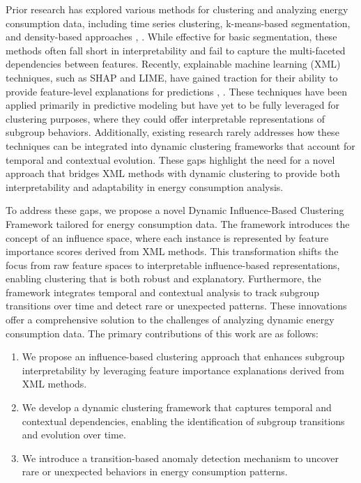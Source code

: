 \documentclass[final,5p,times,twocolumn,numbers]{elsarticle}
\begin{document}
Prior research has explored various methods for clustering and analyzing energy consumption data, including time series clustering, k-means-based segmentation, and density-based approaches \cite{c6}, \cite{c7}. While effective for basic segmentation, these methods often fall short in interpretability and fail to capture the multi-faceted dependencies between features. Recently, explainable machine learning (XML) techniques, such as SHAP and LIME, have gained traction for their ability to provide feature-level explanations for predictions \cite{c8}, \cite{c9}. These techniques have been applied primarily in predictive modeling but have yet to be fully leveraged for clustering purposes, where they could offer interpretable representations of subgroup behaviors. Additionally, existing research rarely addresses how these techniques can be integrated into dynamic clustering frameworks that account for temporal and contextual evolution. These gaps highlight the need for a novel approach that bridges XML methods with dynamic clustering to provide both interpretability and adaptability in energy consumption analysis.

To address these gaps, we propose a novel Dynamic Influence-Based Clustering Framework tailored for energy consumption data. The framework introduces the concept of an influence space, where each instance is represented by feature importance scores derived from XML methods. This transformation shifts the focus from raw feature spaces to interpretable influence-based representations, enabling clustering that is both robust and explanatory. Furthermore, the framework integrates temporal and contextual analysis to track subgroup transitions over time and detect rare or unexpected patterns. These innovations offer a comprehensive solution to the challenges of analyzing dynamic energy consumption data. The primary contributions of this work are as follows: \begin{enumerate} \item We propose an influence-based clustering approach that enhances subgroup interpretability by leveraging feature importance explanations derived from XML methods.
\item We develop a dynamic clustering framework that captures temporal and contextual dependencies, enabling the identification of subgroup transitions and evolution over time. 
\item We introduce a transition-based anomaly detection mechanism to uncover rare or unexpected behaviors in energy consumption patterns. \end{enumerate}
\end{document}
